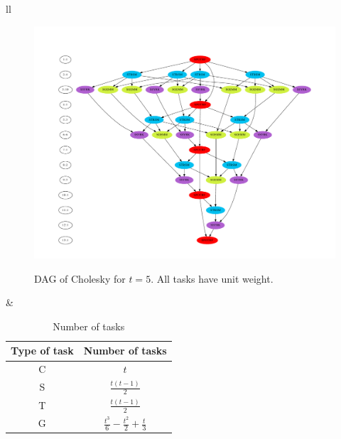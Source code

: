 \begin{frame}

\begin{tabular}{ll}
\begin{minipage}{5cm}
\begin{figure}
\begin{center}
\includegraphics[width=\textwidth]{dag-cholesky-5tile.pdf}\\
\caption{DAG of Cholesky for $t=5$. All tasks have unit weight.}
\end{center}
\end{figure}
\end{minipage}
&
\begin{minipage}{5cm}
\begin{table}
\renewcommand{\arraystretch}{1.6}
\centering
\begin{tabular}{|c|c|}
  \hline
  Type of task & Number of tasks\\
  \hline
  C  & $t$\\
  \hline
  S  & $\frac{t(t-1)}{2}$\\
  \hline
  T  & $\frac{t(t-1)}{2}$ \\
  \hline
  G  & $\frac{t^{3}}{6} - \frac{t^{2}}{2} + \frac{t}{3}$ \\
  \hline
\end{tabular}
\caption {Number of tasks}
\end{table}

\end{minipage}
\end{tabular}


\end{frame}


